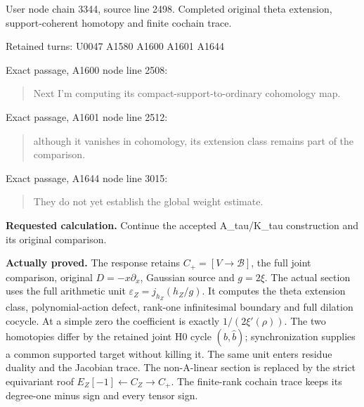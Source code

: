 User node \protect{} chain
3344, source line 2498. Completed original theta extension,
support-coherent homotopy and finite cochain trace.

Retained turns: U0047
\protect{} A1580
\protect{} A1600
\protect{} A1601
\protect{} A1644
\protect{}

Exact passage, A1600 node
\protect{} line 2508:

\begin{quote}
Next I'm computing its compact-support-to-ordinary cohomology map.
\end{quote}

Exact passage, A1601 node
\protect{} line 2512:

\begin{quote}
although it vanishes in cohomology, its extension class remains part of
the comparison.
\end{quote}

Exact passage, A1644 node
\protect{} line 3015:

\begin{quote}
They do not yet establish the global weight estimate.
\end{quote}

\textbf{Requested calculation.} Continue the accepted A\_tau/K\_tau
construction and its original comparison.

\textbf{Actually proved.} The response retains \(C_+=[V\to\mathscr B]\),
the full joint comparison, original \(D=-x\partial_x\), Gaussian source
and \(g=2\xi\). The actual section uses the full arithmetic unit
\(\varepsilon_Z=j_{h_Z}(h_Z/g)\). It computes the theta extension class,
polynomial-action defect, rank-one infinitesimal boundary and full
dilation cocycle. At a simple zero the coefficient is exactly
\(1/(2\xi'(\rho))\). The two homotopies differ by the retained joint H0
cycle \((b,\widehat b)\); synchronization supplies a common supported
target without killing it. The same unit enters residue duality and the
Jacobian trace. The non-A-linear section is replaced by the strict
equivariant roof \(E_Z[-1]\leftarrow C_Z\to C_+\). The finite-rank
cochain trace keeps its degree-one minus sign and every tensor sign.

